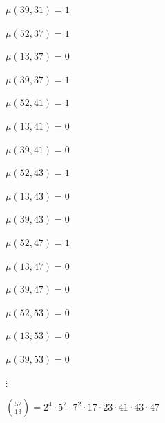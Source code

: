\documentclass{article}
\begin{document}
\( \mu(39,31) = 1 \)

\( \mu(52,37) = 1 \)

\( \mu(13,37) = 0 \)

\( \mu(39,37) = 1 \)

\( \mu(52,41) = 1 \)

\( \mu(13,41) = 0 \)

\( \mu(39,41) = 0 \)

\( \mu(52,43) = 1 \)

\( \mu(13,43) = 0 \)

\( \mu(39,43) = 0 \)

\( \mu(52,47) = 1 \)

\( \mu(13,47) = 0 \)

\( \mu(39,47) = 0 \)

\( \mu(52,53) = 0 \)

\( \mu(13,53) = 0 \)

\( \mu(39,53) = 0 \)

\( \vdots \)

\( \binom{52}{13} = 2^{4} \cdot 5^{2} \cdot 7^{2} \cdot 17 \cdot 23 \cdot 41 \cdot 43 \cdot 47 \)
\end{document}
